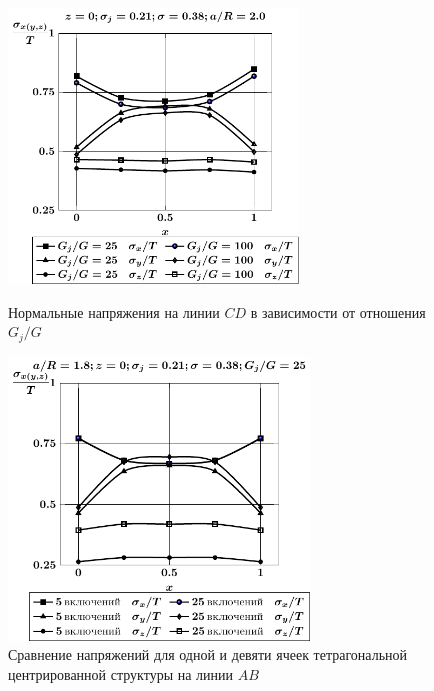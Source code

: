 \begin{russian}
\begin{figure}[h!]
\centering\footnotesize
\parbox[b]{7.5cm}{\centering\includegraphics[width=7.7cm]{inc25-g-a20-h10-r10-z0-cd.pdf}
\caption{Нормальные напряжения на линии $CD$ в зависимости от отношения $G_j/G$
\label{f:7:157}}}\hfil\hfil
\parbox[b]{7.5cm}{\centering\includegraphics[width=8cm]{inc25-5-a18-h10-r10-g25-z0-ab.pdf}
\caption{Сравнение напряжений для одной и девяти ячеек тетрагональной центрированной структуры на линии $AB$
\label{f:7:158}}}
\end{figure}

%


\end{russian}
